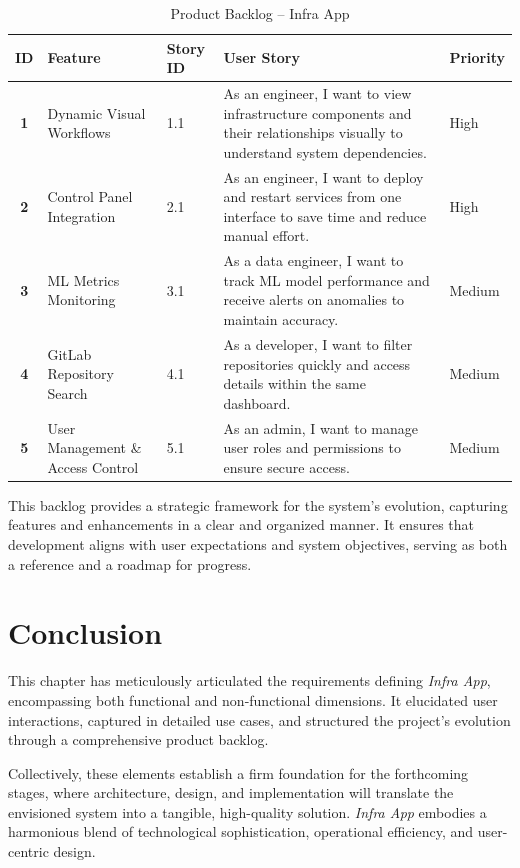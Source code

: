 \begin{table}[h!]
\centering
\renewcommand{\arraystretch}{1.4} %
\setlength{\arrayrulewidth}{0.5mm} %
\setlength{\tabcolsep}{5pt} %
\begin{tabular}{|>{\bfseries}c|m{3.5cm}|m{2cm}|m{8cm}|>{\centering\arraybackslash}m{1.5cm}|}
\hline
\textbf{ID} & \textbf{Feature} & \textbf{Story ID} & \textbf{User Story} & \textbf{Priority} \\ 
\hline
1 & Dynamic Visual Workflows & 1.1 & As an engineer, I want to view infrastructure components and their relationships visually to understand system dependencies. & High \\[1ex]
\hline
2 & Control Panel Integration & 2.1 & As an engineer, I want to deploy and restart services from one interface to save time and reduce manual effort. & High \\[1ex]
\hline
3 & ML Metrics Monitoring & 3.1 & As a data engineer, I want to track ML model performance and receive alerts on anomalies to maintain accuracy. & Medium \\[1ex]
\hline
4 & GitLab Repository Search & 4.1 & As a developer, I want to filter repositories quickly and access details within the same dashboard. & Medium \\[1ex]
\hline
5 & User Management \& Access Control & 5.1 & As an admin, I want to manage user roles and permissions to ensure secure access. & Medium \\ 
\hline
\end{tabular}
\caption{Product Backlog – Infra App}
\end{table}

This backlog provides a strategic framework for the system’s evolution, capturing features and enhancements in a clear and organized manner. It ensures that development aligns with user expectations and system objectives, serving as both a reference and a roadmap for progress.

\section{Conclusion}
This chapter has meticulously articulated the requirements defining \textit{Infra App}, encompassing both functional and non-functional dimensions. It elucidated user interactions, captured in detailed use cases, and structured the project’s evolution through a comprehensive product backlog.

Collectively, these elements establish a firm foundation for the forthcoming stages, where architecture, design, and implementation will translate the envisioned system into a tangible, high-quality solution. \textit{Infra App} embodies a harmonious blend of technological sophistication, operational efficiency, and user-centric design.
